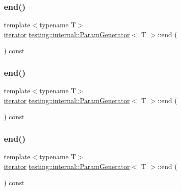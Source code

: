 \subsubsection{\texorpdfstring{end()}{end()}\hspace{0.1cm}{\footnotesize\ttfamily [1/3]}}
{\footnotesize\ttfamily template$<$typename T$>$ \\
\mbox{\hyperlink{classtesting_1_1internal_1_1_param_generator_a448b08a8eaae1f1d27840d4dbd66c357}{iterator}} \mbox{\hyperlink{classtesting_1_1internal_1_1_param_generator}{testing\+::internal\+::\+Param\+Generator}}$<$ T $>$\+::end (\begin{DoxyParamCaption}{ }\end{DoxyParamCaption}) const\hspace{0.3cm}{\ttfamily [inline]}}

\mbox{\label{classtesting_1_1internal_1_1_param_generator_aaf8f75df1099a07ff771a550b48f9fbe}} 
\subsubsection{\texorpdfstring{end()}{end()}\hspace{0.1cm}{\footnotesize\ttfamily [2/3]}}
{\footnotesize\ttfamily template$<$typename T$>$ \\
\mbox{\hyperlink{classtesting_1_1internal_1_1_param_generator_a448b08a8eaae1f1d27840d4dbd66c357}{iterator}} \mbox{\hyperlink{classtesting_1_1internal_1_1_param_generator}{testing\+::internal\+::\+Param\+Generator}}$<$ T $>$\+::end (\begin{DoxyParamCaption}{ }\end{DoxyParamCaption}) const\hspace{0.3cm}{\ttfamily [inline]}}

\mbox{\label{classtesting_1_1internal_1_1_param_generator_aaf8f75df1099a07ff771a550b48f9fbe}} 
\subsubsection{\texorpdfstring{end()}{end()}\hspace{0.1cm}{\footnotesize\ttfamily [3/3]}}
{\footnotesize\ttfamily template$<$typename T$>$ \\
\mbox{\hyperlink{classtesting_1_1internal_1_1_param_generator_a448b08a8eaae1f1d27840d4dbd66c357}{iterator}} \mbox{\hyperlink{classtesting_1_1internal_1_1_param_generator}{testing\+::internal\+::\+Param\+Generator}}$<$ T $>$\+::end (\begin{DoxyParamCaption}{ }\end{DoxyParamCaption}) const\hspace{0.3cm}{\ttfamily [inline]}}

